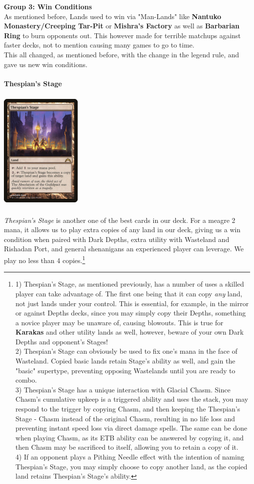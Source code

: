 \documentclass{report}
\begin{document}
\newpage
\textbf{Group 3: Win Conditions}\\
As mentioned before, Lands used to win via "Man-Lands" like \textbf{Nantuko Monastery/Creeping Tar-Pit} or \textbf{Mishra's Factory}  as well as \textbf{Barbarian Ring} to burn opponents out. This however made for terrible matchups against faster decks, not to mention causing many games to go to time. \\This all changed, as mentioned before, with the change in the legend rule, and gave us new win conditions.\\\\
\textbf{Thespian's Stage\\}
\begin{center}
\includegraphics [width = 4cm, height = 6cm] {thespian-stage}
\end{center}
\emph{Thespian's Stage} is another one of the best cards in our deck. For a meagre 2 mana, it allows us to play extra copies of any land in our deck, giving us a win condition when paired with Dark Depths, extra utility with Wasteland and Rishadan Port, and general shenanigans an experienced player can leverage. We play no less than 4 copies.\footnote{1) Thespian's Stage, as mentioned previously, has a number of uses a skilled player can take advantage of. The first one being that it can copy \emph{any} land, not just lands under your control. This is essential, for example, in the mirror or against Depths decks, since you may simply copy their Depths, something a novice player may be unaware of, causing blowouts. This is true for \textbf{Karakas} and other utility lands as well, however, beware of your own Dark Depths and opponent's Stages!\\
2) Thespian's Stage can obviously be used to fix one's mana in the face of Wasteland. Copied basic lands retain Stage's ability as well, and gain the "basic" supertype, preventing opposing Wastelands until you are ready to combo.\\
3) Thespian's Stage has a unique interaction with Glacial Chasm. Since Chasm's cumulative upkeep is a triggered ability and uses the stack, you may respond to the trigger by copying Chasm, and then keeping the Thespian's Stage - Chasm instead of the original Chasm, resulting in no life loss and preventing instant speed loss via direct damage spells. The same can be done when playing Chasm, as its ETB ability can be answered by copying it, and then Chasm may be sacrificed to itself, allowing you to retain a copy of it.\\
4) If an opponent plays a Pithing Needle effect with the intention of naming Thespian's Stage, you may simply choose to copy another land, as the copied land retains Thespian's Stage's ability.}
\end{document}
